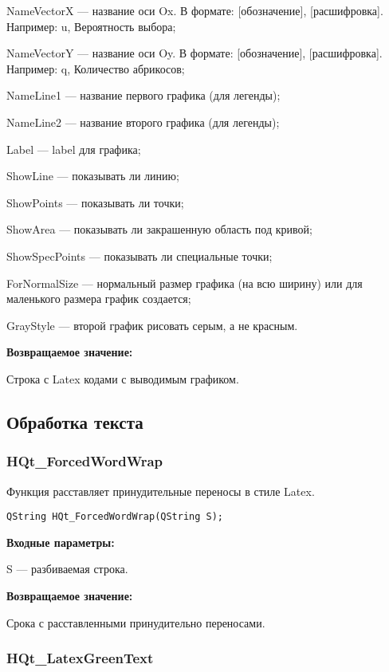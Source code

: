 \documentclass[a4paper,12pt]{article}
\begin{document}
    NameVectorX --- название оси Ox. В формате: [обозначение], [расшифровка]. Например: u, Вероятность выбора;
 
    NameVectorY --- название оси Oy. В формате: [обозначение], [расшифровка]. Например: q, Количество абрикосов;
 
    NameLine1 --- название первого графика (для легенды);
 
    NameLine2 --- название второго графика (для легенды);
 
    Label --- label для графика;
 
    ShowLine --- показывать ли линию;
 
    ShowPoints --- показывать ли точки;
 
    ShowArea --- показывать ли закрашенную область под кривой;
 
    ShowSpecPoints --- показывать ли специальные точки;
 
    ForNormalSize --- нормальный размер графика (на всю ширину) или для маленького размера график создается;
 
    GrayStyle --- второй график рисовать серым, а не красным.
	
\textbf{Возвращаемое значение:}

Строка с Latex кодами с выводимым графиком.


\subsection{Обработка текста}

\subsubsection{HQt\_ForcedWordWrap}\label{HQt_ForcedWordWrap}

Функция расставляет принудительные переносы в стиле Latex.


\begin{lstlisting}[label=code_syntax_HQt_ForcedWordWrap,caption=Синтаксис]
QString HQt_ForcedWordWrap(QString S);
\end{lstlisting}

\textbf{Входные параметры:}

S --- разбиваемая строка.

\textbf{Возвращаемое значение:}

 Срока с расставленными принудительно переносами.


\subsubsection{HQt\_LatexGreenText}\label{HQt_LatexGreenText}
\end{document}
